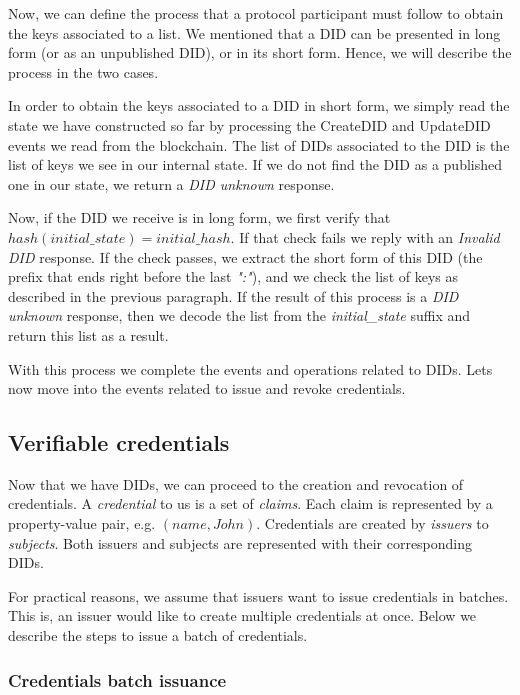 \documentclass[10pt,a4paper]{article}
\begin{document}
Now, we can define the process that a protocol participant must follow to obtain the keys associated to a list. 
We mentioned that a DID can be presented in long form (or as an unpublished DID), or in its short form. Hence, we will describe the process in the two cases.

In order to obtain the keys associated to a DID in short form, we simply read the state we have constructed so far by processing the CreateDID and UpdateDID events we read from the blockchain. The list of DIDs associated to the DID is the list of keys we see in our internal state. If we do not find the DID as a published one in our state, we return a \emph{DID unknown} response.

Now, if the DID we receive is in long form, we first verify that $hash(initial\_state) = initial\_hash$. If that check fails we reply with an \emph{Invalid DID} response. If the check passes, we extract the short form of this DID (the prefix that ends right before the last \emph{":"}), and we check the list of keys as described in the previous paragraph. If the result of this process is a \emph{DID unknown} response, then we decode the list from the \emph{initial\_state} suffix and return this list as a result.

With this process we complete the events and operations related to DIDs. 
Lets now move into the events related to issue and revoke credentials.

\subsection{Verifiable credentials}

Now that we have DIDs, we can proceed to the creation and revocation of credentials. A \emph{credential} to us is a set of \emph{claims}. Each claim is represented by a property-value pair, e.g. $(name, John)$. Credentials are created by \emph{issuers} to \emph{subjects}. Both issuers and subjects are represented with their corresponding DIDs. 

For practical reasons, we assume that issuers want to issue credentials in batches. This is, an issuer would like to create multiple credentials at once. Below we describe the steps to issue a batch of credentials.

\subsubsection{Credentials batch issuance}
\end{document}
